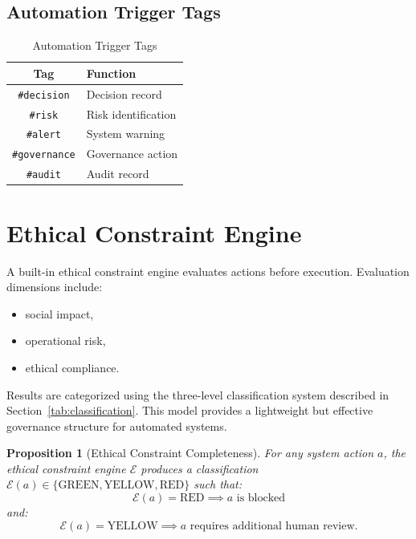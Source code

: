 \documentclass[conference]{IEEEtran}
\newtheorem{proposition}{Proposition}
\begin{document}
\subsection{Automation Trigger Tags}

\begin{table}[t]
\centering
\caption{Automation Trigger Tags}
\label{tab:tags}
\renewcommand{\arraystretch}{1.2}
\begin{tabular}{cl}
\toprule
\textbf{Tag} & \textbf{Function} \\
\midrule
\texttt{\#decision} & Decision record \\
\texttt{\#risk} & Risk identification \\
\texttt{\#alert} & System warning \\
\texttt{\#governance} & Governance action \\
\texttt{\#audit} & Audit record \\
\bottomrule
\end{tabular}
\end{table}

\section{Ethical Constraint Engine}

A built-in ethical constraint engine evaluates actions before
execution. Evaluation dimensions include:
\begin{itemize}[nosep]
  \item social impact,
  \item operational risk,
  \item ethical compliance.
\end{itemize}

Results are categorized using the three-level classification
system described in Section~\ref{tab:classification}.
This model provides a lightweight but effective governance
structure for automated systems.

\begin{proposition}[Ethical Constraint Completeness]
For any system action $a$, the ethical constraint engine
$\mathcal{E}$ produces a classification
$\mathcal{E}(a) \in \{\text{GREEN}, \text{YELLOW}, \text{RED}\}$
such that:
\begin{equation}
  \mathcal{E}(a) = \text{RED} \implies a \text{ is blocked}
\end{equation}
and:
\begin{equation}
  \mathcal{E}(a) = \text{YELLOW} \implies a \text{ requires
    additional human review}.
\end{equation}
\end{proposition}
\end{document}
